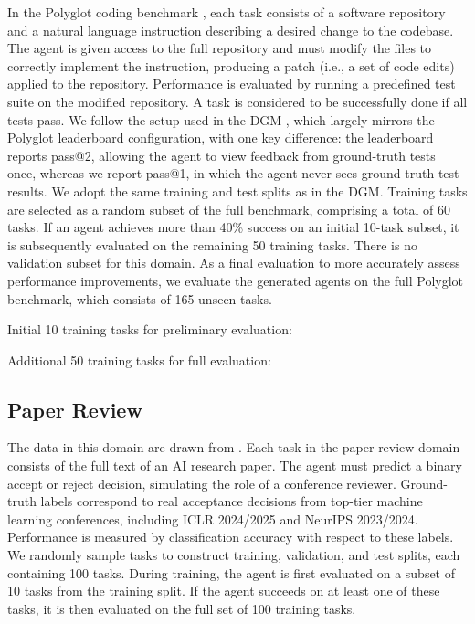 \documentclass{article}
\begin{document}
In the Polyglot coding benchmark \citep{gauthier2024polyglot}, each task consists of a software repository and a natural language instruction describing a desired change to the codebase. The agent is given access to the full repository and must modify the files to correctly implement the instruction, producing a patch (i.e., a set of code edits) applied to the repository. Performance is evaluated by running a predefined test suite on the modified repository. A task is considered to be successfully done if all tests pass. We follow the setup used in the DGM \citep{zhang2025darwin}, which largely mirrors the Polyglot leaderboard configuration, with one key difference: the leaderboard reports pass@2, allowing the agent to view feedback from ground-truth tests once, whereas we report pass@1, in which the agent never sees ground-truth test results. We adopt the same training and test splits as in the DGM. Training tasks are selected as a random subset of the full benchmark, comprising a total of 60 tasks. If an agent achieves more than 40\% success on an initial 10-task subset, it is subsequently evaluated on the remaining 50 training tasks. There is no validation subset for this domain. As a final evaluation to more accurately assess performance improvements, we evaluate the generated agents on the full Polyglot benchmark, which consists of 165 unseen tasks.

Initial 10 training tasks for preliminary evaluation:

Additional 50 training tasks for full evaluation:


\subsection{Paper Review}
\label{app:domain-paperreview}

The data in this domain are drawn from \citet{zhao2026apres}. Each task in the paper review domain consists of the full text of an AI research paper. The agent must predict a binary accept or reject decision, simulating the role of a conference reviewer. Ground-truth labels correspond to real acceptance decisions from top-tier machine learning conferences, including ICLR 2024/2025 and NeurIPS 2023/2024. Performance is measured by classification accuracy with respect to these labels. We randomly sample tasks to construct training, validation, and test splits, each containing 100 tasks. During training, the agent is first evaluated on a subset of 10 tasks from the training split. If the agent succeeds on at least one of these tasks, it is then evaluated on the full set of 100 training tasks.
\end{document}
